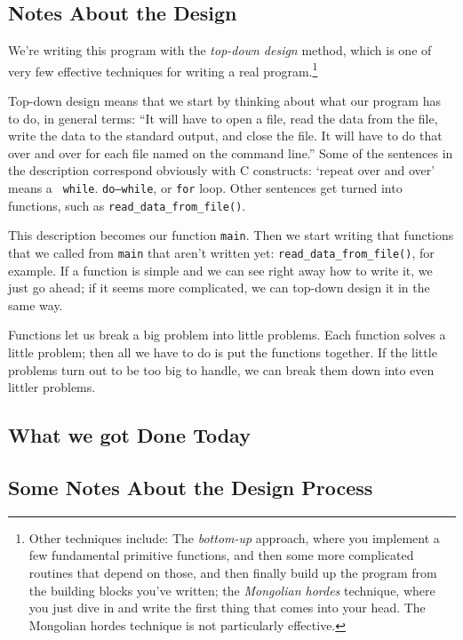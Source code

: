 \subsection{Notes About the Design}

We're writing this program with the {\em top-down design}\/ method,
which is one of very few effective techniques for writing a real
program.\footnote{Other techniques include: The {\em bottom-up}\/
approach, where you implement a few fundamental primitive functions, and
then some more complicated routines that depend on those, and then
finally build up the program from the building blocks you've written;
the {\em Mongolian hordes}\/ technique, where you just dive in and write
the first thing that comes into your head.  The Mongolian hordes
technique is not particularly effective.}  

Top-down design means that we start by thinking about what our program
has to do, in general terms:  ``It will have to open a file, read the
data from the file, write the data to the standard output, and close the
file.  It will have to do that over and over for each file named on the
command line.''  Some of the sentences in the description correspond
obviously with C constructs:  `repeat over and over' means a {\tt
while}. {\tt do{\rm--}while}, or {\tt for} loop.  Other sentences get
turned into functions, such as {\tt read\_data\_from\_file()}.

This description becomes our function {\tt main}.  Then we start writing
that functions that we called from {\tt main} that aren't written yet:
{\tt read\_data\_from\_file()}, for example.  If a function is
simple and we can see right away how to write it, we just go ahead; if
it seems more complicated, we can top-down design it in the same way.

Functions let us break a big problem into little problems.  Each
function solves a little problem; then all we have to do is put the
functions together.  If the little problems turn out to be too big to
handle, we can break them down into even littler problems.

\subsection{What we got Done Today}



\subsection{Some Notes About the Design Process}

